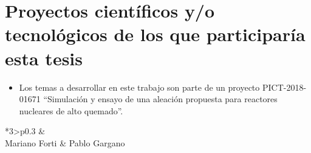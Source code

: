 \section{ Proyectos científicos y/o tecnológicos de los que participaría esta tesis  }

\begin{itemize}

\item Los temas a desarrollar en este trabajo son parte de un proyecto
PICT-2018-01671 ``Simulación y ensayo de una aleación propuesta para reactores nucleares de alto quemado''.

\end{itemize}



\printbibliography

\vspace{2cm}
\begin{table}[h!]
  \begin{tabular*}{\textwidth}{ *{3}{>\centering p{0.3\textwidth} } }
    &\\
    \hline
    Mariano Forti & Pablo Gargano \\
  \end{tabular*}
\end{table}

